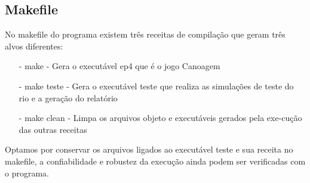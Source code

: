 \documentclass[a4paper,11pt]{article}
\begin{document}
\subsection{Makefile}
No makefile do programa existem três receitas de compila\c{c}ão que geram três alvos diferentes:
\begin{enumerate}
\item[-]{make - Gera o executável ep4 que é o jogo Canoagem}
\item[-]{make teste - Gera o executável teste que realiza as simula\c{c}ões de teste do rio e a gera\c{c}ão do relatório}
\item[-]{make clean - Limpa os arquivos objeto e executáveis gerados pela exe-cu\c{c}ão das outras receitas}
\end{enumerate}
Optamos por conservar os arquivos ligados ao executável teste e sua receita no makefile, a confiabilidade e robustez da execução ainda podem ser verificadas com o programa.
\end{document}
